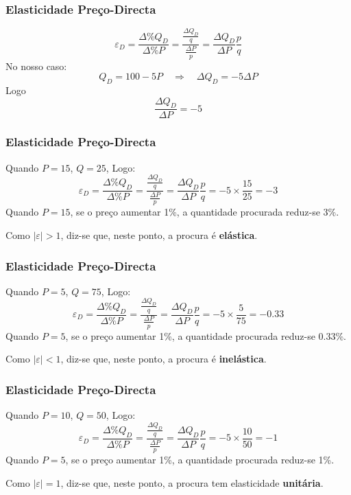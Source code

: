 \begin{frame}
	\frametitle{Elasticidade Pre\c co-Directa}
	\[\varepsilon_D=\frac{\Delta\% Q_D}{\Delta\% P}=\frac{\frac{\Delta Q_D}{q}}{\frac{\Delta P}{p}}=\frac{\Delta Q_D}{\Delta P}\frac{p}{q}\]
	No nosso caso:\[Q_D=100-5P\quad\Rightarrow\quad\Delta Q_D=-5\Delta P\] Logo \[\frac{\Delta Q_D}{\Delta P}=-5\]
\end{frame}

\begin{frame}
	\frametitle{Elasticidade Pre\c co-Directa}
	Quando $P=15$, $Q=25$, Logo:\[\varepsilon_D=\frac{\Delta \% Q_D}{\Delta \% P}=\frac{\frac{\Delta Q_D}{q}}{\frac{\Delta P}{p}}=\frac{\Delta Q_D}{\Delta P}\frac{p}{q}=-5\times\frac{15}{25}=-3\]
	Quando $P=15$, se o pre\c co aumentar 1\%, a quantidade procurada reduz-se 3\%.\par
	Como $|\varepsilon|>1$, diz-se que, neste ponto, a procura \'e \textbf{el\'astica}.
\end{frame}

\begin{frame}
	\frametitle{Elasticidade Pre\c co-Directa}
	Quando $P=5$, $Q=75$, Logo:\[\varepsilon_D=\frac{\Delta \% Q_D}{\Delta \% P}=\frac{\frac{\Delta Q_D}{q}}{\frac{\Delta P}{p}}=\frac{\Delta Q_D}{\Delta P}\frac{p}{q}=-5\times\frac{5}{75}=-0.33\]
	Quando $P=5$, se o pre\c co aumentar 1\%, a quantidade procurada reduz-se 0.33\%.\par
	Como $|\varepsilon|<1$, diz-se que, neste ponto, a procura \'e \textbf{inel\'astica}.
\end{frame}

\begin{frame}
	\frametitle{Elasticidade Pre\c co-Directa}
	Quando $P=10$, $Q=50$, Logo:\[\varepsilon_D=\frac{\Delta \% Q_D}{\Delta \% P}=\frac{\frac{\Delta Q_D}{q}}{\frac{\Delta P}{p}}=\frac{\Delta Q_D}{\Delta P}\frac{p}{q}=-5\times\frac{10}{50}=-1\]
	Quando $P=5$, se o pre\c co aumentar 1\%, a quantidade procurada reduz-se 1\%.\par
	Como $|\varepsilon|=1$, diz-se que, neste ponto, a procura tem elasticidade \textbf{unit\'aria}.
\end{frame}

